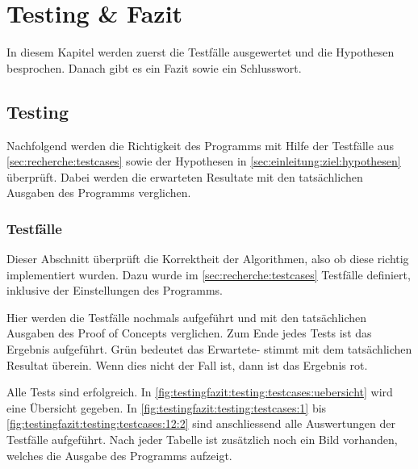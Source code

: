 
\chapter{Testing \& Fazit}
\label{sec:testingfazit}
In diesem Kapitel werden zuerst die Testfälle ausgewertet und die Hypothesen besprochen. Danach gibt es ein Fazit sowie ein Schlusswort.

\section{Testing}
\label{sec:testingfazit:testing}
Nachfolgend werden die Richtigkeit des Programms mit Hilfe der Testfälle aus \cref{sec:recherche:testcases}  sowie der Hypothesen in \cref{sec:einleitung:ziel:hypothesen}  überprüft. Dabei werden die erwarteten Resultate mit den tatsächlichen Ausgaben des Programms verglichen.

\subsection{Testfälle}
\label{sec:testingfazit:testing:testcases}
Dieser Abschnitt überprüft die Korrektheit der Algorithmen, also ob diese richtig implementiert wurden. Dazu wurde im \cref{sec:recherche:testcases} Testfälle definiert, inklusive der Einstellungen des Programms.

Hier werden die Testfälle nochmals aufgeführt und mit den tatsächlichen Ausgaben des Proof of Concepts verglichen. Zum Ende jedes Tests ist das Ergebnis aufgeführt. \colorbox{green!25}{Grün} bedeutet das Erwartete- stimmt mit dem tatsächlichen Resultat überein. Wenn dies nicht der Fall ist, dann ist das Ergebnis \colorbox{red!25}{rot}.

Alle Tests sind erfolgreich. In \cref{fig:testingfazit:testing:testcases:uebersicht} wird eine Übersicht gegeben. In \cref{fig:testingfazit:testing:testcases:1} bis \cref{fig:testingfazit:testing:testcases:12:2} sind anschliessend alle Auswertungen der Testfälle aufgeführt. Nach jeder Tabelle ist zusätzlich noch ein Bild vorhanden, welches die Ausgabe des Programms aufzeigt.

